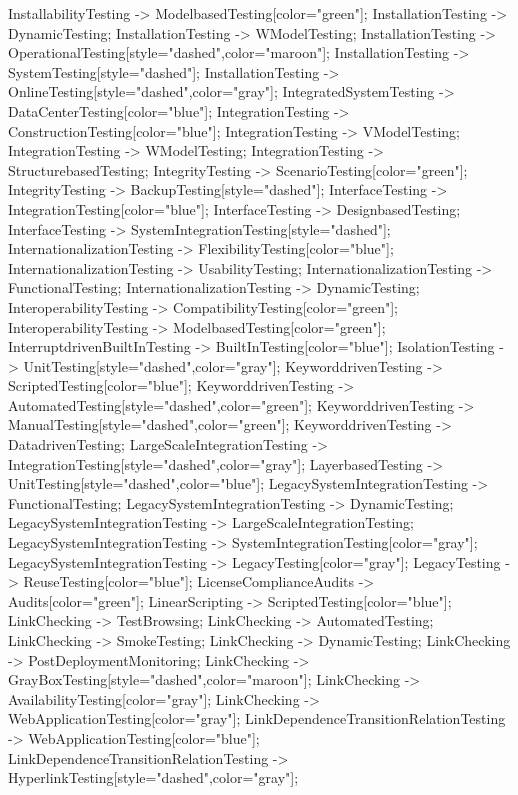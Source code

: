 \documentclass{article}
\begin{document}
{InstallabilityTesting -> ModelbasedTesting[color="green"];
InstallationTesting -> DynamicTesting;
InstallationTesting -> WModelTesting;
InstallationTesting -> OperationalTesting[style="dashed",color="maroon"];
InstallationTesting -> SystemTesting[style="dashed"];
InstallationTesting -> OnlineTesting[style="dashed",color="gray"];
IntegratedSystemTesting -> DataCenterTesting[color="blue"];
IntegrationTesting -> ConstructionTesting[color="blue"];
IntegrationTesting -> VModelTesting;
IntegrationTesting -> WModelTesting;
IntegrationTesting -> StructurebasedTesting;
IntegrityTesting -> ScenarioTesting[color="green"];
IntegrityTesting -> BackupTesting[style="dashed"];
InterfaceTesting -> IntegrationTesting[color="blue"];
InterfaceTesting -> DesignbasedTesting;
InterfaceTesting -> SystemIntegrationTesting[style="dashed"];
InternationalizationTesting -> FlexibilityTesting[color="blue"];
InternationalizationTesting -> UsabilityTesting;
InternationalizationTesting -> FunctionalTesting;
InternationalizationTesting -> DynamicTesting;
InteroperabilityTesting -> CompatibilityTesting[color="green"];
InteroperabilityTesting -> ModelbasedTesting[color="green"];
InterruptdrivenBuiltInTesting -> BuiltInTesting[color="blue"];
IsolationTesting -> UnitTesting[style="dashed",color="gray"];
KeyworddrivenTesting -> ScriptedTesting[color="blue"];
KeyworddrivenTesting -> AutomatedTesting[style="dashed",color="green"];
KeyworddrivenTesting -> ManualTesting[style="dashed",color="green"];
KeyworddrivenTesting -> DatadrivenTesting;
LargeScaleIntegrationTesting -> IntegrationTesting[style="dashed",color="gray"];
LayerbasedTesting -> UnitTesting[style="dashed",color="blue"];
LegacySystemIntegrationTesting -> FunctionalTesting;
LegacySystemIntegrationTesting -> DynamicTesting;
LegacySystemIntegrationTesting -> LargeScaleIntegrationTesting;
LegacySystemIntegrationTesting -> SystemIntegrationTesting[color="gray"];
LegacySystemIntegrationTesting -> LegacyTesting[color="gray"];
LegacyTesting -> ReuseTesting[color="blue"];
LicenseComplianceAudits -> Audits[color="green"];
LinearScripting -> ScriptedTesting[color="blue"];
LinkChecking -> TestBrowsing;
LinkChecking -> AutomatedTesting;
LinkChecking -> SmokeTesting;
LinkChecking -> DynamicTesting;
LinkChecking -> PostDeploymentMonitoring;
LinkChecking -> GrayBoxTesting[style="dashed",color="maroon"];
LinkChecking -> AvailabilityTesting[color="gray"];
LinkChecking -> WebApplicationTesting[color="gray"];
LinkDependenceTransitionRelationTesting -> WebApplicationTesting[color="blue"];
LinkDependenceTransitionRelationTesting -> HyperlinkTesting[style="dashed",color="gray"];
}
\end{document}
